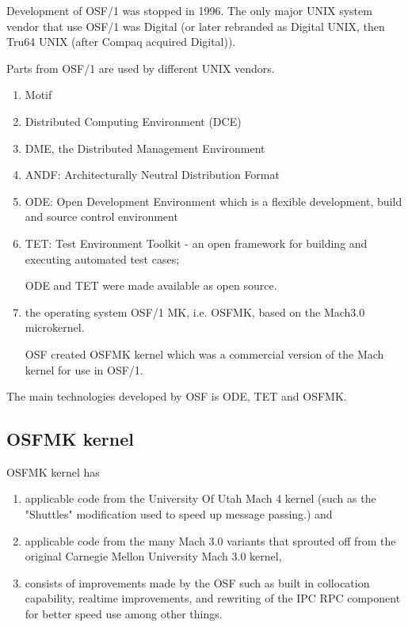 Development of OSF/1 was stopped in 1996. The only major UNIX system vendor that
use OSF/1 was Digital (or later rebranded as Digital UNIX, then Tru64 UNIX
(after Compaq acquired Digital)).

Parts from OSF/1 are used by different UNIX vendors.
\begin{enumerate}

  \item Motif 
  
  
  \item Distributed Computing Environment (DCE)
  
  \item DME, the Distributed Management Environment 
  
  \item ANDF: Architecturally Neutral Distribution Format
  
  \item ODE: Open Development Environment which is
   a flexible development, build and source control environment
   
   \item TET: Test Environment Toolkit - an open framework for building and
   executing automated test cases;
   
    ODE and TET were made available as open source.
    
   \item the operating system OSF/1 MK, i.e. OSFMK, based on the Mach3.0 microkernel.

OSF created OSFMK kernel which was a commercial version of the
Mach kernel for use in OSF/1.   
   
\end{enumerate}
The main technologies developed by OSF is ODE, TET and OSFMK. 

\subsection{OSFMK kernel}
\label{sec:OSFMK}

OSFMK kernel has 
\begin{enumerate}
  
  \item applicable code from the University Of Utah Mach 4 kernel (such as the
"Shuttles" modification used to speed up message passing.) and 

  \item applicable code from the many Mach 3.0 variants that sprouted off from
  the original Carnegie Mellon University Mach 3.0 kernel, 
  
  \item   consists of improvements made by the OSF such as built in collocation
  capability, realtime improvements, and rewriting of the IPC RPC component for
  better speed use among other things.

\end{enumerate}

